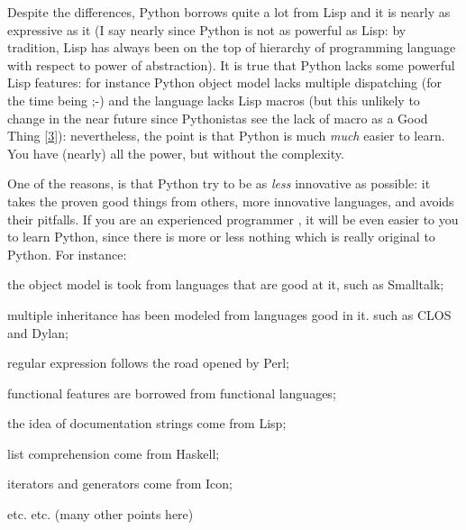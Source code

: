 \documentclass[11pt,english]{book}
\begin{document}
Despite the differences, Python borrows quite a lot from Lisp and it
is nearly as expressive as it (I say nearly since Python is 
not as powerful as Lisp: by tradition, Lisp has always been on the top of 
hierarchy of programming language with respect to power of abstraction).
It is true that Python lacks some powerful Lisp features: for instance 
Python object model lacks multiple dispatching (for the time being ;-) 
and the language lacks Lisp macros (but this unlikely to change in the 
near future since Pythonistas see the lack of macro as a Good Thing [\hyperlink{id6}{3}]): 
nevertheless, the point is that Python is much \emph{much} easier to learn. 
You have (nearly) all the power, but without the complexity.

One of the reasons, is that Python
try to be as \emph{less} innovative as
possible: it takes the proven good things from others, more innovative
languages, and avoids their pitfalls. If you are an experienced
programmer , it will be even  easier to you to learn Python, since
there is more or less nothing which is really original to Python.
For instance:
\begin{list}{.}
{
\setlength{\rightmargin}{\leftmargin}
}
\item 
the object model is took from languages that are good at it, such
as Smalltalk;

\item 
multiple inheritance has been modeled from languages good in it. such
as CLOS and Dylan;

\item 
regular expression follows the road opened by Perl;

\item 
functional features are borrowed from functional languages;

\item 
the idea of documentation strings come from Lisp;

\item 
list comprehension come from Haskell;

\item 
iterators and generators come from Icon;

\item 
etc. etc. (many other points here)

\end{list}
\end{document}
